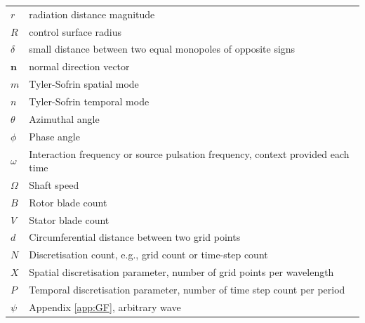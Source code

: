 \begin{longtable}{p{2.5cm} p{13.5cm}}
$r$ & radiation distance magnitude \\
$R$ & control surface radius \\
$\delta$ & small distance between two equal monopoles of opposite signs \\

$\textbf{n}$ & normal direction vector \\
$m$ & Tyler-Sofrin spatial mode \\
$n$ & Tyler-Sofrin temporal mode \\
$\theta$ & Azimuthal angle \\
$\phi$ & Phase angle \\
$\omega$ & Interaction frequency or source pulsation frequency, context provided each time \\
$\Omega$ & Shaft speed \\
$B$ & Rotor blade count \\
$V$ & Stator blade count \\
$d$ & Circumferential distance between two grid points \\
$N$ & Discretisation count, e.g., grid count or time-step count \\
$X$ & Spatial discretisation parameter, number of grid points per wavelength \\
$P$ & Temporal discretisation parameter, number of time step count per period \\
$\psi$ & Appendix \ref{app:GF}, arbitrary wave \\


\end{longtable}

